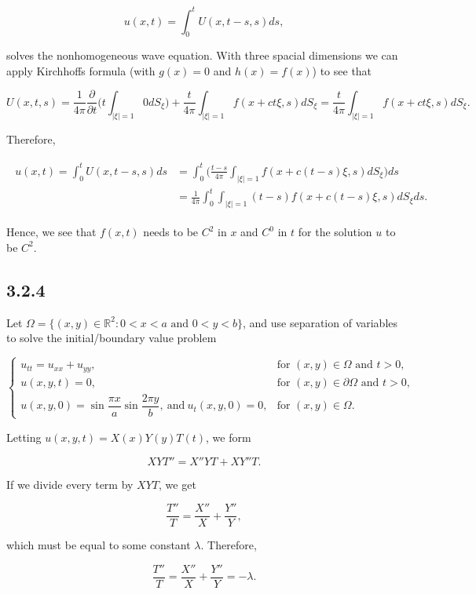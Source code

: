 \documentclass{article}
\begin{document}
$$u(x,t)=\int_0^t U(x,t-s,s)ds,$$

solves the nonhomogeneous wave equation. With three spacial dimensions we can apply Kirchhoff\textsc{}s formula (with $g(x)=0$ and $h(x)=f(x)$) to see that

$$U(x,t,s)=\frac{1}{4\pi}\frac{\partial}{\partial t}\Bigg(t\int_{|\xi|=1} 0 dS_{\xi}\Bigg) + \frac{t}{4\pi}\int_{|\xi|=1} f(x+ct\xi,s)dS_{\xi}=\frac{t}{4\pi}\int_{|\xi|=1} f(x+ct\xi,s)dS_{\xi}.$$

Therefore,

\begin{align*}
\begin{split}
u(x,t)=\int_0^t U(x,t-s,s)ds &= \int_0^t \Bigg(\frac{t-s}{4\pi}\int_{|\xi|=1} f(x+c(t-s)\xi,s)dS_{\xi} \Bigg)ds \\ &= \frac{1}{4\pi}\int_0^t\int_{|\xi|=1} (t-s)f(x+c(t-s)\xi,s)dS_{\xi} ds.
\end{split}
\end{align*}

Hence, we see that $f(x,t)$ needs to be $C^2$ in $x$ and $C^0$ in $t$ for the solution $u$ to be $C^2$.


\subsection{\textbf{3.2.4}} Let $\Omega=\{(x,y)\in\mathbb R^2 : \text{$0<x<a$ and $0<y<b$}\}$, and use separation of variables to solve the initial/boundary value problem

\[
  \begin{cases}
    u_{tt}=u_{xx}+u_{yy}, & \text{for $(x,y)\in\Omega$ and $t>0$}, \\
    u(x,y,t)=0, & \text{for $(x,y)\in\partial\Omega$ and $t>0$}, \\
    u(x,y,0)=\sin{\dfrac{\pi x}{a}}\sin{\dfrac{2\pi y}{b}}, ~\text{and}~u_t(x,y,0)=0, & \text{for $(x,y)\in\Omega$}.
  \end{cases}
\]

Letting $u(x,y,t)=X(x)Y(y)T(t)$, we form

$$XYT''=X''YT + XY''T.$$

If we divide every term by $XYT$, we get

$$\frac{T''}{T} = \frac{X''}{X} + \frac{Y''}{Y},$$

which must be equal to some constant $\lambda$. Therefore,

$$\frac{T''}{T} = \frac{X''}{X} + \frac{Y''}{Y} = - \lambda. $$
\end{document}
